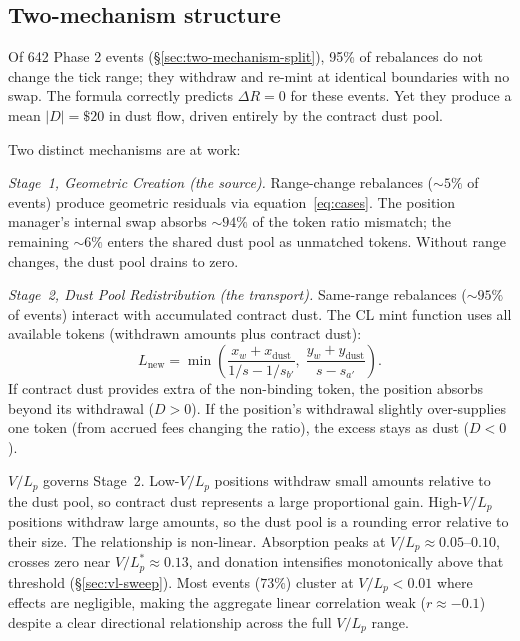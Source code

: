 \documentclass[11pt,a4paper]{article}
\begin{document}
\subsection{Two-mechanism structure}\label{sec:two-mechanism}

Of 642 Phase 2 events (\S\ref{sec:two-mechanism-split}), 95\% of rebalances do not change the tick range; they withdraw and re-mint at identical boundaries with no swap. The formula correctly predicts $\Delta R = 0$ for these events. Yet they produce a mean $|D| = \$20$ in dust flow, driven entirely by the contract dust pool.

Two distinct mechanisms are at work:

\emph{Stage~1, Geometric Creation (the source).} Range-change rebalances (${\sim}5\%$ of events) produce geometric residuals via equation~\eqref{eq:cases}. The position manager's internal swap absorbs ${\sim}94\%$ of the token ratio mismatch; the remaining ${\sim}6\%$ enters the shared dust pool as unmatched tokens. Without range changes, the dust pool drains to zero.

\emph{Stage~2, Dust Pool Redistribution (the transport).} Same-range rebalances (${\sim}95\%$ of events) interact with accumulated contract dust. The CL mint function uses all available tokens (withdrawn amounts plus contract dust):
\begin{equation}\label{eq:mint}
L_{\text{new}} = \min\!\left(\frac{x_w + x_{\text{dust}}}{1/s - 1/s_{b'}}, \; \frac{y_w + y_{\text{dust}}}{s - s_{a'}}\right).
\end{equation}
If contract dust provides extra of the non-binding token, the position absorbs beyond its withdrawal ($D > 0$). If the position's withdrawal slightly over-supplies one token (from accrued fees changing the ratio), the excess stays as dust ($D < 0$).

$V/L_p$ governs Stage~2. Low-$V/L_p$ positions withdraw small amounts relative to the dust pool, so contract dust represents a large proportional gain. High-$V/L_p$ positions withdraw large amounts, so the dust pool is a rounding error relative to their size. The relationship is non-linear. Absorption peaks at $V/L_p \approx 0.05$--$0.10$, crosses zero near $V/L_p^* \approx 0.13$, and donation intensifies monotonically above that threshold (\S\ref{sec:vl-sweep}). Most events ($73\%$) cluster at $V/L_p < 0.01$ where effects are negligible, making the aggregate linear correlation weak ($r \approx -0.1$) despite a clear directional relationship across the full $V/L_p$ range.
\end{document}
